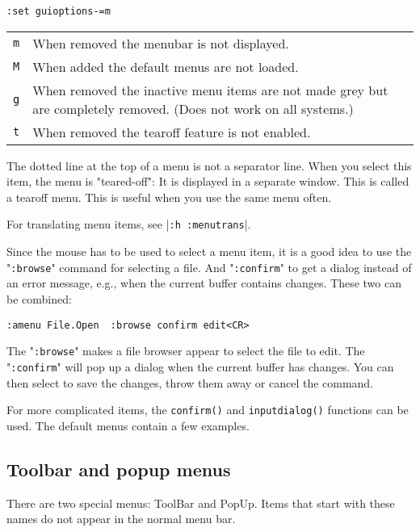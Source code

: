 \begin{Verbatim}[samepage=true]
 :set guioptions-=m
\end{Verbatim}
 
\begin{center} \begin{tabular}{c l}
				\verb!m! & When removed the menubar is not displayed. \\
				\verb!M! & When added the default menus are not loaded. \\
				\verb!g! & When removed the inactive menu items are not made grey but are completely removed.  (Does not work on all systems.) \\
				\verb!t! & When removed the tearoff feature is not enabled. \\
\end{tabular} \end{center}

The dotted line at the top of a menu is not a separator line.
When you select this item, the menu is "teared-off": It is displayed in a separate window.
This is called a tearoff menu.
This is useful when you use the same menu often.

For translating menu items, see |\verb!:h :menutrans!|.

Since the mouse has to be used to select a menu item, it is a good idea to use the "\verb!:browse!" command for selecting a file.
And "\verb!:confirm!" to get a dialog instead of an error message, e.g., when the current buffer contains changes.
These two can be combined:

\begin{Verbatim}[samepage=true]
 :amenu File.Open  :browse confirm edit<CR>
\end{Verbatim}

The "\verb!:browse!" makes a file browser appear to select the file to edit.
The "\verb!:confirm!" will pop up a dialog when the current buffer has changes.
You can then select to save the changes, throw them away or cancel the command.

For more complicated items, the \verb!confirm()! and \verb!inputdialog()! functions can be used.
The default menus contain a few examples.
\subsection{Toolbar and popup menus}
There are two special menus: ToolBar and PopUp.
Items that start with these names do not appear in the normal menu bar.

